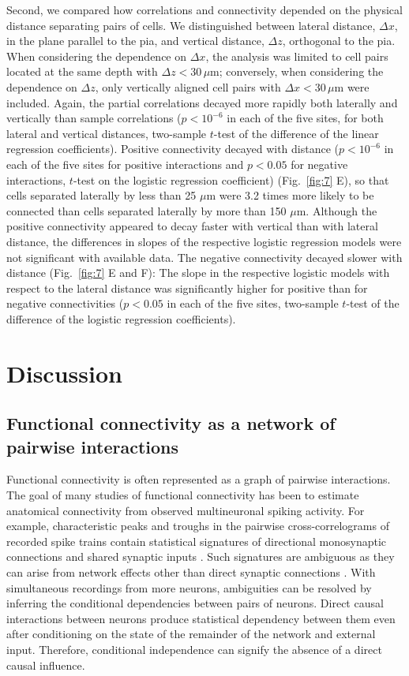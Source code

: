 Second, we compared how correlations and connectivity depended on the physical distance separating pairs of cells. We distinguished between lateral distance, $\Delta x$, in the plane parallel to the pia, and vertical distance, $\Delta z$, orthogonal to the pia.  When considering the dependence on $\Delta x$, the analysis was limited to cell pairs located at the same depth with $\Delta z < 30\,\mu\mbox{m}$; conversely, when considering the dependence on $\Delta z$, only vertically aligned cell pairs with $\Delta x < 30\,\mu\mbox{m}$ were included. Again, the partial correlations decayed more rapidly both laterally and vertically than sample correlations ($p<10^{-6}$ in each of the five sites, for both lateral and vertical distances, two-sample $t$-test of the difference of the linear regression coefficients).
Positive connectivity decayed with distance ($p<10^{-6}$ in each of the five sites for positive interactions and $p<0.05$ for negative interactions, $t$-test on the logistic regression coefficient) (Fig.~\ref{fig:7} E), so that cells separated laterally by less than 25 $\mu\mbox{m}$ were 3.2 times more likely to be connected than cells separated laterally by more than 150 $\mu\mbox{m}$. Although the positive connectivity appeared to decay faster with vertical than with lateral distance, the differences in slopes of the respective logistic regression models were not significant with available data. The negative connectivity decayed slower with distance (Fig.~\ref{fig:7} E and F): The slope in the respective logistic models with respect to the lateral distance was significantly higher for positive than for negative connectivities ($p<0.05$ in each of the five sites, two-sample $t$-test of the difference of the logistic regression coefficients).

\section*{Discussion}
\subsection*{Functional connectivity as a network of pairwise interactions}
Functional connectivity is often represented as a graph of pairwise interactions. The goal of many studies of functional connectivity has been to estimate  anatomical connectivity from  observed multineuronal spiking activity.  For example, characteristic peaks and troughs in the pairwise cross-correlograms of recorded spike trains contain statistical signatures of directional monosynaptic connections and shared synaptic inputs \cite{Gerstein:1964, Perkel:1967, Moore:1970, Alonso:1998, Denman:2013}.  Such signatures are ambiguous as they can arise from network effects other than direct synaptic connections \cite{Aertsen:1989}.  With simultaneous recordings from more neurons, ambiguities can be resolved by inferring the conditional dependencies between pairs of neurons.  Direct causal interactions between neurons produce statistical dependency between them even after conditioning on the state of the remainder of the network and external input. Therefore, conditional independence can signify the absence of a direct causal influence.


